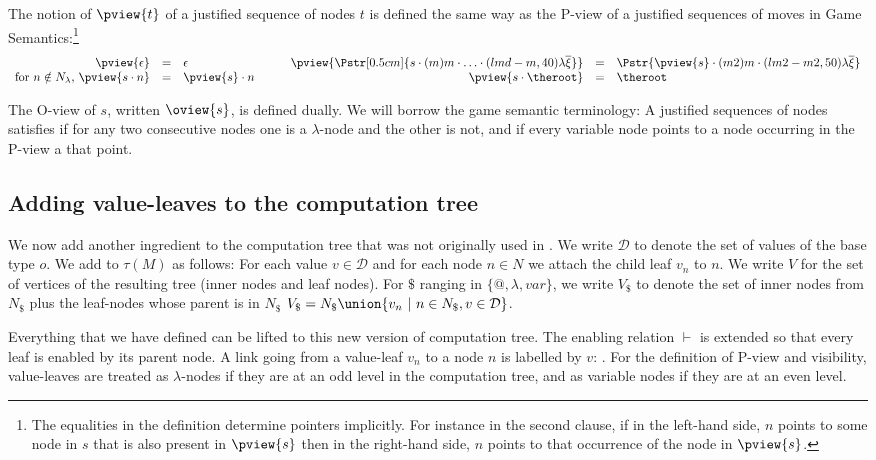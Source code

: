 The notion of  $\pview{t}$ of a justified sequence of nodes $t$ is defined the same way as the P-view of a justified sequences of moves in Game Semantics:\footnote{ The equalities in the
  definition determine pointers implicitly. For instance in the second
  clause, if in the left-hand side, $n$ points to some node in $s$
  that is also present in $\pview{s}$ then in the right-hand side, $n$
  points to that occurrence of the node in $\pview{s}$.}
$$\begin{array}{rclrcl}
\pview{\epsilon} &=&  \epsilon & \pview{\Pstr[0.5cm]{ s \cdot (m) m \cdot \ldots \cdot (lmd-m,40){\lambda\overline{\xi}} }}
 &=& \Pstr{
\pview{s} \cdot (m2) m \cdot (lm2-m2,50) {\lambda \overline{\xi}} } \\
\mbox{for $n \notin N_\lambda$, } \pview{s \cdot n }  &=&  \pview{s} \cdot n \qquad & \pview{s \cdot \theroot }  &=&  \theroot
\end{array}$$

The O-view of $s$, written $\oview{s}$, is defined dually. We will borrow the game semantic terminology: A justified sequences of nodes satisfies  if for any two consecutive nodes one is a $\lambda$-node and the other is not, and  if every variable node points to a node occurring in the P-view a that point.

\subsection{Adding value-leaves to the computation tree}

We now add another ingredient to the computation tree that was not originally used in \cite{OngLics2006}.  We write $\mathcal{D}$ to denote the set of values of the base type $o$.  We add
 to $\tau(M)$ as follows: For each value $v
\in \mathcal{D}$ and for each node $n \in N$ we attach the child leaf $v_n$ to $n$.  We write $V$ for the set of vertices of the resulting tree (\ie inner nodes and leaf nodes). For $\$$ ranging in $\{@, \lambda, var \}$, we write $V_\$$ to denote the set of inner nodes from $N_\$$ plus the leaf-nodes whose parent is in $N_\$$ \ie $V_\$ = N_\$ \union \{ v_n \ | \ n \in N_\$, v \in \mathcal{D} \}$.


Everything that we have defined can be lifted to this new version of computation tree. The enabling relation $\vdash$ is extended so that every leaf is enabled by its parent node. A link going from a value-leaf $v_n$ to a node $n$ is labelled by $v$: . For the definition of P-view and visibility, value-leaves are treated as $\lambda$-nodes if they are at an odd level in the computation tree, and as variable nodes if they are at an even level.

